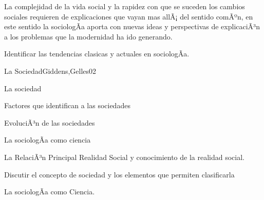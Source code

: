 \begin{syllabus}


\begin{justification}
La complejidad de la vida social y la rapidez con que se suceden los cambios sociales requieren 
de explicaciones que vayan mas allÃ¡ del sentido comÃºn, en este sentido la sociologÃ­a 
aporta con nuevas ideas y perspectivas de explicaciÃ³n a los problemas que la modernidad 
ha ido generando.
\end{justification}

\begin{goals}
\item Identificar las tendencias clasicas y actuales en sociologÃ­a.
\end{goals}

\begin{outcomes}
\end{outcomes}

\begin{unit}{La Sociedad}{Giddens,Gelles}{0}{2}
    \begin{topics}
      \item La sociedad
      \item Factores que identifican a las sociedades
      \item EvoluciÃ³n de las sociedades
      \item La sociologÃ­a como ciencia
      \item La RelaciÃ³n Principal Realidad Social y conocimiento de la realidad social.
    \end{topics}
    \begin{unitgoals}
      \item Discutir el concepto de sociedad y los elementos que permiten clasificarla
      \item La sociologÃ­a como Ciencia.
    \end{unitgoals}
\end{unit}


\end{syllabus}
